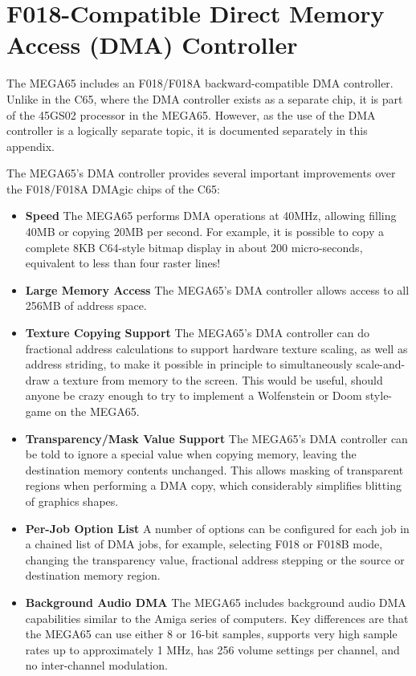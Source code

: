 \chapter{F018-Compatible Direct Memory Access (DMA) Controller}
\label{cha:dmagic}

The MEGA65 includes an F018/F018A backward-compatible DMA controller.
Unlike in the C65, where the DMA controller exists as a separate
chip, it is part of the 45GS02 processor in the MEGA65.  However, as the
use of the DMA controller is a logically separate topic, it is documented
separately in this appendix.

The MEGA65's DMA controller provides several important improvements over the
F018/F018A DMAgic chips of the C65:

\begin{itemize}
\item{\bf Speed} The MEGA65 performs DMA operations at 40MHz, allowing filling 40MB or copying 20MB
  per second.  For example, it is possible to copy a complete 8KB C64-style bitmap display in
  about 200 micro-seconds, equivalent to less than four raster lines!
 \item{\bf Large Memory Access} The MEGA65's DMA controller allows access to all 256MB of address space.
\item{\bf Texture Copying Support} The MEGA65's DMA controller can do fractional address calculations
  to support hardware texture scaling, as well as address striding, to make it possible in principle
  to simultaneously scale-and-draw a texture from memory to the screen. This would be useful, should
  anyone be crazy enough to try to implement a Wolfenstein or Doom style-game on the MEGA65.
\item{\bf Transparency/Mask Value Support} The MEGA65's DMA controller can be told to ignore a special value
   when copying memory, leaving the destination memory contents unchanged. This allows masking of transparent
   regions when performing a DMA copy, which considerably simplifies blitting of graphics shapes.
\item{\bf Per-Job Option List} A number of options can be configured for each job in a chained list of DMA
  jobs, for example, selecting F018 or F018B mode, changing the transparency value, fractional address stepping
  or the source or destination memory region.

\item{\bf Background Audio DMA}
  The MEGA65 includes background audio DMA capabilities similar to the Amiga\texttrademark{} series of computers.
  Key differences are that the MEGA65 can use either 8 or 16-bit samples, supports very high sample rates
  up to approximately 1 MHz, has 256 volume settings per channel, and no inter-channel modulation.

\end{itemize}


